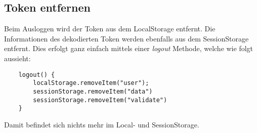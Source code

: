 \subsection{Token entfernen}

Beim Ausloggen wird der Token aus dem LocalStorage entfernt. Die Informationen des dekodierten Token 
werden ebenfalls aus dem SessionStorage entfernt. Dies erfolgt ganz einfach mittels einer \textit{logout}
Methode, welche wie folgt aussieht:

\begin{lstlisting}
    logout() {
        localStorage.removeItem("user");
        sessionStorage.removeItem("data")
        sessionStorage.removeItem("validate")
    }    
\end{lstlisting}

Damit befindet sich nichts mehr im Local- und SessionStorage.
